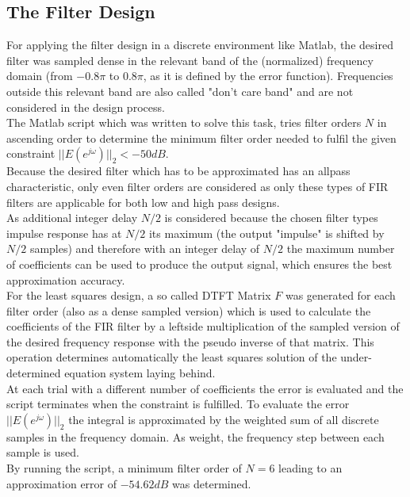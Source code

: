 \subsection{The Filter Design}
\label{chap:filter_design}
For applying the filter design in a discrete environment like Matlab, the desired filter was sampled dense in the relevant band of the (normalized) frequency domain (from $-0.8\pi$ to $0.8\pi$, as it is defined by the error function). Frequencies outside this relevant band are also called "don't care band" and are not considered in the design process.\\
The Matlab script which was written to solve this task, tries filter orders $N$ in ascending order to determine the minimum filter order needed to fulfil the given constraint $||E(e^{j\omega})||_2 < -50dB$.\\
Because the desired filter which has to be approximated has an allpass characteristic, only even filter orders are considered as only these types of FIR filters are applicable for both low and high pass designs.\\
As additional integer delay $N/2$ is considered because the chosen filter types impulse response has at $N/2$ its maximum (the output "impulse" is shifted by $N/2$ samples) and therefore with an integer delay of $N/2$ the maximum number of coefficients can be used to produce the output signal, which ensures the best approximation accuracy.\\
For the least squares design, a so called DTFT Matrix $F$ was generated for each filter order (also as a dense sampled version) which is used to calculate the coefficients of the FIR filter by a leftside multiplication of the sampled version of the desired frequency response with the pseudo inverse of that matrix. This operation determines automatically the least squares solution of the under-determined equation system laying behind.\\
At each trial with a different number of coefficients the error is evaluated and the script terminates when the constraint is fulfilled. To evaluate the error $||E(e^{j\omega})||_2$ the integral is approximated by the weighted sum of all discrete samples in the frequency domain. As weight, the frequency step between each sample is used.\\
By running the script, a minimum filter order of $N=6$ leading to an approximation error of $-54.62dB$ was determined.

